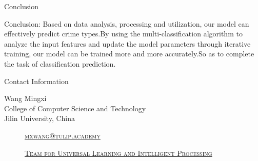 \documentclass[
 size=14pt,
 paper=smartboard,  %
 mode=present, 		%
 display=slides, 	%
 style=tuliplab,  	%
 pauseslide,
 fleqn,leqno]{powerdot}
\begin{document}
\begin{slide}{Conclusion}

Conclusion: Based on data analysis, processing and utilization, our model can effectively predict crime types.By using the multi-classification algorithm to analyze the input features and update the model parameters through iterative training, our model can be trained more and more accurately.So as to complete the task of classification prediction.


\end{slide}







\begin{wideslide}[toc=,bm=]{Contact Information}
\centering
{}
\twocolumn[
lcolwidth=0.35\linewidth,
rcolwidth=0.65\linewidth
]
{
}
{
Wang Mingxi\\
College of Computer Science and Technology\\
Jilin University, China
\begin{description}
 \item[\textcolor{orange}{\faEnvelope}] \href{mailto:mxwang@tulip.academy}
 {\textsc{\footnotesize{mxwang@tulip.academy}}}

 \item[\textcolor{orange}{\faHome}] \href{http://www.tulip.org.au}
 {\textsc{\footnotesize{Team for Universal Learning and Intelligent Processing}}}
\end{description}
}
\end{wideslide}
\end{document}
